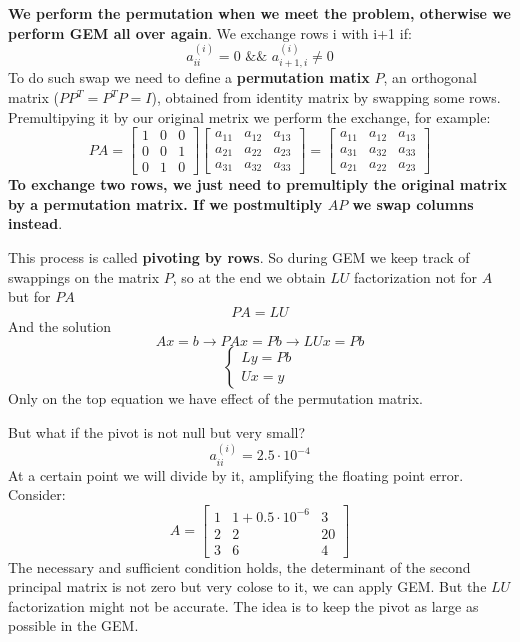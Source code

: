     \textbf{We perform the permutation when we meet the problem, otherwise we perform GEM all over again}.
    We exchange rows i with i+1 if:
    $$
    a_{ii}^{(i)}=0\,\,\&\&\,\,a_{i+1,i}^{(i)}\neq 0
    $$
    To do such swap we need to define a \textbf{permutation matix} $P$, an orthogonal matrix ($PP^T=P^TP=I$), obtained from identity matrix by swapping some rows. Premultipying it by our original metrix we perform the exchange, for example:
    $$
    PA=\begin{bmatrix}
        1 & 0 & 0\\
        0 & 0 & 1\\
        0 & 1 & 0
    \end{bmatrix}
    \begin{bmatrix}
        a_{11} & a_{12} & a_{13}\\
        a_{21} & a_{22} & a_{23}\\
        a_{31} & a_{32} & a_{33}
    \end{bmatrix}=
    \begin{bmatrix}
        a_{11} & a_{12} & a_{13}\\
        a_{31} & a_{32} & a_{33}\\
        a_{21} & a_{22} & a_{23}
    \end{bmatrix}
    $$
    \textbf{To exchange two rows, we just need to premultiply the original matrix by a permutation matrix. If we postmultiply $AP$ we swap columns instead}.

    This process is called \textbf{pivoting by rows}. So during GEM we keep track of swappings on the matrix $P$, so at the end we obtain $LU$ factorization not for $A$ but for $PA$
    $$PA=LU$$
    And the solution
    $$
    Ax=b\rightarrow PAx=Pb\rightarrow LUx=Pb
    $$
    $$
    \begin{cases}
        Ly=Pb\\
        Ux=y
    \end{cases}
    $$
    Only on the top equation we have effect of the permutation matrix.

    But what if the pivot is not null but very small?
    $$
    a_{ii}^{(i)}=2.5\cdot 10^{-4}
    $$
    At a certain point we will divide by it, amplifying the floating point error. Consider:
    $$
    A=\begin{bmatrix}
        1 &  1+0.5\cdot 10^{-6} & 3\\
        2 & 2 & 20\\
        3 & 6 & 4
    \end{bmatrix}
    $$
    The necessary and sufficient condition holds, the determinant of the second principal matrix is not zero but very colose to it, we can apply GEM. But the $LU$ factorization might not be accurate. The idea is to keep the pivot as large as possible in the GEM.
    
